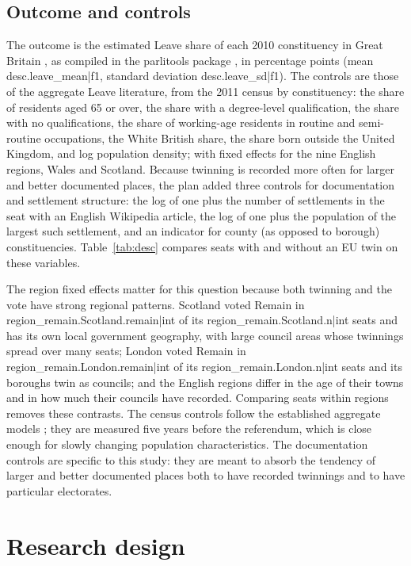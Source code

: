 \documentclass[11pt,a4paper]{article}
\begin{document}
\subsection{Outcome and controls}
The outcome is the estimated Leave share of each 2010 constituency in Great Britain \citep{hanretty2017}, as compiled in the parlitools package \citep{parlitools}, in percentage points (mean {{desc.leave_mean|f1}}, standard deviation {{desc.leave_sd|f1}}). The controls are those of the aggregate Leave literature, from the 2011 census by constituency: the share of residents aged 65 or over, the share with a degree-level qualification, the share with no qualifications, the share of working-age residents in routine and semi-routine occupations, the White British share, the share born outside the United Kingdom, and log population density; with fixed effects for the nine English regions, Wales and Scotland. Because twinning is recorded more often for larger and better documented places, the plan added three controls for documentation and settlement structure: the log of one plus the number of settlements in the seat with an English Wikipedia article, the log of one plus the population of the largest such settlement, and an indicator for county (as opposed to borough) constituencies. Table~\ref{tab:desc} compares seats with and without an EU twin on these variables.

The region fixed effects matter for this question because both twinning and the vote have strong regional patterns. Scotland voted Remain in {{region_remain.Scotland.remain|int}} of its {{region_remain.Scotland.n|int}} seats and has its own local government geography, with large council areas whose twinnings spread over many seats; London voted Remain in {{region_remain.London.remain|int}} of its {{region_remain.London.n|int}} seats and its boroughs twin as councils; and the English regions differ in the age of their towns and in how much their councils have recorded. Comparing seats within regions removes these contrasts. The census controls follow the established aggregate models \citep{becker2017,goodwin2016}; they are measured five years before the referendum, which is close enough for slowly changing population characteristics. The documentation controls are specific to this study: they are meant to absorb the tendency of larger and better documented places both to have recorded twinnings and to have particular electorates.

\section{Research design}\label{sec:design}
\end{document}
